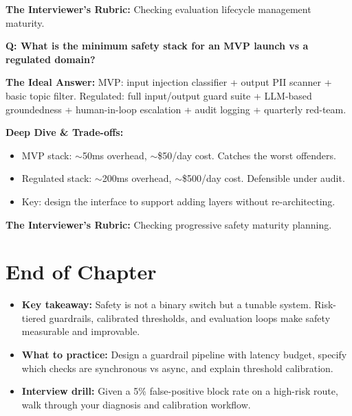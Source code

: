 \textbf{The Interviewer's Rubric:} Checking evaluation lifecycle management maturity.

\textbf{Q: What is the minimum safety stack for an MVP launch vs a regulated domain?}

\textbf{The Ideal Answer:} MVP: input injection classifier + output PII scanner + basic topic filter. Regulated: full input/output guard suite + LLM-based groundedness + human-in-loop escalation + audit logging + quarterly red-team.

\textbf{Deep Dive \& Trade-offs:}
\begin{itemize}
  \item MVP stack: $\sim$50ms overhead, $\sim$\$50/day cost. Catches the worst offenders.
  \item Regulated stack: $\sim$200ms overhead, $\sim$\$500/day cost. Defensible under audit.
  \item Key: design the interface to support adding layers without re-architecting.
\end{itemize}

\textbf{The Interviewer's Rubric:} Checking progressive safety maturity planning.

\section*{End of Chapter}

\begin{itemize}
  \item \textbf{Key takeaway:} Safety is not a binary switch but a tunable system. Risk-tiered guardrails, calibrated thresholds, and evaluation loops make safety measurable and improvable.
  \item \textbf{What to practice:} Design a guardrail pipeline with latency budget, specify which checks are synchronous vs async, and explain threshold calibration.
  \item \textbf{Interview drill:} Given a 5\% false-positive block rate on a high-risk route, walk through your diagnosis and calibration workflow.
\end{itemize}
